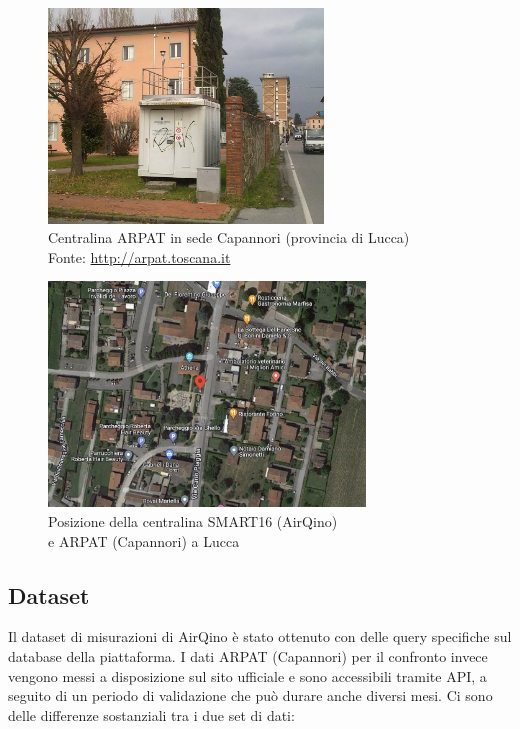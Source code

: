 \begin{figure}[H]
\centering
\captionsetup{justification=centering}
\includegraphics[width=0.65\textwidth,height=\textheight,keepaspectratio]{img/lu-capannori.jpg}
\caption{Centralina ARPAT in sede Capannori (provincia di Lucca)\\Fonte: \url{http://arpat.toscana.it}}
\label{fig:capannori}
\end{figure}

\begin{figure}[H]
\centering
\captionsetup{justification=centering}
\includegraphics[width=0.75\textwidth,height=\textheight,keepaspectratio]{img/capannori_gps.png}
\caption{Posizione della centralina SMART16 (AirQino)\\e ARPAT (Capannori) a Lucca}
\label{fig:capannori-gps}
\end{figure}

\subsection{Dataset }\label{ssec:dataset-no2}
Il dataset di misurazioni  di AirQino è stato ottenuto con delle query specifiche sul database della piattaforma.
I dati ARPAT (Capannori) per il confronto invece vengono messi a disposizione sul sito ufficiale \cite{arpat} e sono accessibili tramite API, a seguito di un periodo di validazione che può durare anche diversi mesi.
Ci sono delle differenze sostanziali tra i due set di dati:

